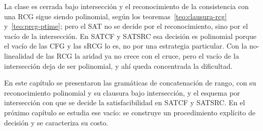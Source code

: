 \documentclass{report}
\theoremstyle{definition}
\theoremstyle{plain}
\theoremstyle{remark}
\begin{document}
La clase es cerrada bajo intersección y el reconocimiento de la
consistencia con una RCG sigue siendo polinomial, según los
teoremas~\ref{teo:clausura-rcg} y~\ref{teo:prcg-ptime}; pero el SAT no se
decide por el reconocimiento, sino por el vacío de la intersección. En SATCF y SATSRC
esa decisión es polinomial porque el vacío de las CFG y las sRCG lo es,
no por una estrategia particular. Con la no-linealidad de las RCG la
aridad ya no crece con el cruce, pero el vacío de la intersección deja de
ser polinomial, y ahí queda concentrada la dificultad.

En este capítulo se presentaron las gramáticas de concatenación de
rango, con su reconocimiento polinomial y su clausura bajo intersección,
y el esquema por intersección con que se decide la satisfacibilidad en
SATCF y SATSRC. En el próximo capítulo se estudia ese vacío: se
construye un procedimiento explícito de decisión y se caracteriza su
costo.



\end{document}
